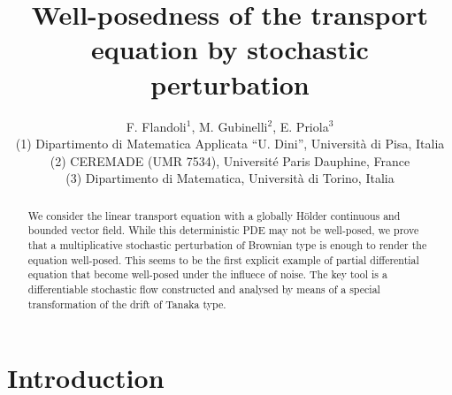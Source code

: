 \documentclass[a4paper,10pt]{article}
\begin{document}
\title{
Well-posedness of the transport equation by stochastic
perturbation }
\author{F. Flandoli$^{1}$,
M. Gubinelli$^{2}$, E. Priola$^{3}$\\{\small {(1) Dipartimento di
Matematica Applicata ``U. Dini'', Universit\`a di Pisa,
Italia}}\\{\small { (2) CEREMADE  (UMR 7534), Universit\'e Paris
Dauphine, France}}\\{\small { (3) Dipartimento di Matematica,
Universit\`a di Torino, Italia }}} \maketitle
\begin{abstract}
We consider  the linear transport equation with a globally
H\"{o}lder continuous and bounded vector field. While this
deterministic PDE may not be well-posed, we prove that a
multiplicative stochastic perturbation of Brownian type is enough
to render the equation well-posed. This seems to be the first
explicit example of partial differential equation that become
well-posed under the influece of noise. The key tool is a
differentiable stochastic flow constructed and analysed by means
of a special transformation of the drift of Tanaka type.
\end{abstract}





\section{Introduction}
\end{document}
